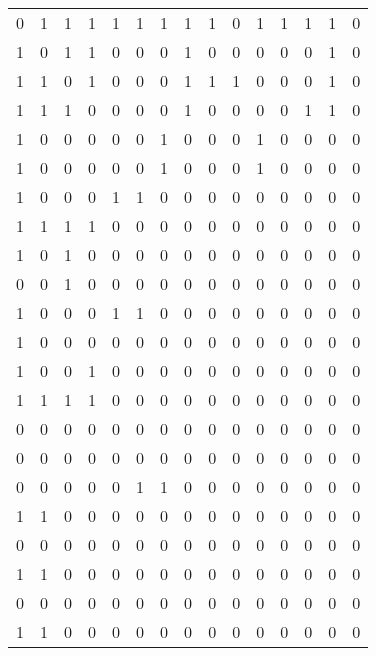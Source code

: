 \begin{table}[!ht]
    \centering
    \setlength\tabcolsep{2pt}
    \begin{tabular}{lllllllllllllll}
        0 & 1 & 1 & 1 & 1 & 1 & 1 & 1 & 1 & 0 & 1 & 1 & 1 & 1 & 0 \\ 
        1 & 0 & 1 & 1 & 0 & 0 & 0 & 1 & 0 & 0 & 0 & 0 & 0 & 1 & 0 \\ 
        1 & 1 & 0 & 1 & 0 & 0 & 0 & 1 & 1 & 1 & 0 & 0 & 0 & 1 & 0 \\ 
        1 & 1 & 1 & 0 & 0 & 0 & 0 & 1 & 0 & 0 & 0 & 0 & 1 & 1 & 0 \\ 
        1 & 0 & 0 & 0 & 0 & 0 & 1 & 0 & 0 & 0 & 1 & 0 & 0 & 0 & 0 \\ 
        1 & 0 & 0 & 0 & 0 & 0 & 1 & 0 & 0 & 0 & 1 & 0 & 0 & 0 & 0 \\ 
        1 & 0 & 0 & 0 & 1 & 1 & 0 & 0 & 0 & 0 & 0 & 0 & 0 & 0 & 0 \\ 
        1 & 1 & 1 & 1 & 0 & 0 & 0 & 0 & 0 & 0 & 0 & 0 & 0 & 0 & 0 \\ 
        1 & 0 & 1 & 0 & 0 & 0 & 0 & 0 & 0 & 0 & 0 & 0 & 0 & 0 & 0 \\ 
        0 & 0 & 1 & 0 & 0 & 0 & 0 & 0 & 0 & 0 & 0 & 0 & 0 & 0 & 0 \\ 
        1 & 0 & 0 & 0 & 1 & 1 & 0 & 0 & 0 & 0 & 0 & 0 & 0 & 0 & 0 \\ 
        1 & 0 & 0 & 0 & 0 & 0 & 0 & 0 & 0 & 0 & 0 & 0 & 0 & 0 & 0 \\ 
        1 & 0 & 0 & 1 & 0 & 0 & 0 & 0 & 0 & 0 & 0 & 0 & 0 & 0 & 0 \\ 
        1 & 1 & 1 & 1 & 0 & 0 & 0 & 0 & 0 & 0 & 0 & 0 & 0 & 0 & 0 \\ 
        0 & 0 & 0 & 0 & 0 & 0 & 0 & 0 & 0 & 0 & 0 & 0 & 0 & 0 & 0 \\ 
        0 & 0 & 0 & 0 & 0 & 0 & 0 & 0 & 0 & 0 & 0 & 0 & 0 & 0 & 0 \\ 
        0 & 0 & 0 & 0 & 0 & 1 & 1 & 0 & 0 & 0 & 0 & 0 & 0 & 0 & 0 \\ 
        1 & 1 & 0 & 0 & 0 & 0 & 0 & 0 & 0 & 0 & 0 & 0 & 0 & 0 & 0 \\ 
        0 & 0 & 0 & 0 & 0 & 0 & 0 & 0 & 0 & 0 & 0 & 0 & 0 & 0 & 0 \\ 
        1 & 1 & 0 & 0 & 0 & 0 & 0 & 0 & 0 & 0 & 0 & 0 & 0 & 0 & 0 \\ 
        0 & 0 & 0 & 0 & 0 & 0 & 0 & 0 & 0 & 0 & 0 & 0 & 0 & 0 & 0 \\ 
        1 & 1 & 0 & 0 & 0 & 0 & 0 & 0 & 0 & 0 & 0 & 0 & 0 & 0 & 0 \\ 

\end{tabular}
\end{table}
